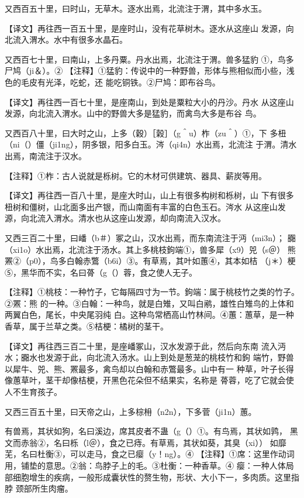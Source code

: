 \documentclass[a4paper,12pt,UTF8,twoside]{ctexbook}
\begin{document}
又西百五十里，曰时山，无草木。逐水出焉，北流注于渭，其中多水玉。

【译文】再往西一百五十里，是座时山，没有花草树木。逐水从这座山 发源，向北流入渭水。水中有很多水晶石。

又西百七十里，曰南山，上多丹粟。丹水出焉，北流注于渭。兽多猛豹 ①，鸟多尸鸠（ji＆）。② 【注释】①猛豹：传说中的一种野兽，形体与熊相似而小些，浅色的毛皮有光泽，吃蛇，还 能吃铜铁。②尸鸠：即布谷鸟。

【译文】再往西一百七十里，是座南山，到处是粟粒大小的丹沙。丹水 从这座山发源，向北流入渭水。山中的野兽大多是猛豹，而禽鸟大多是布谷 鸟。

又西百八十里，曰大时之山，上多（穀）［榖］（g＾u）柞（zu＾）①，下 多杻（ni（）僵（ji1ng），阴多银，阳多白玉。涔（qi4n）水出焉，北流注 于渭。清水出焉，南流注于汉水。

【注释】①柞：古人说就是栎树。它的木材可供建筑、器具、薪炭等用。

【译文】再往西一百八十里，是座大时山，山上有很多构树和栎树，山 下有很多杻树和僵树，山北面多出产银，而山南面有丰富的白色玉石。涔水 从这座山发源，向北流入渭水。清水也从这座山发源，却向南流入汉水。

又西三百二十里，曰嶓（b＃）冢之山，汉水出焉，而东南流注于沔（mi3n）； 嚻（xi1o）水出焉，北流注于汤水。其上多桃枝鉤端①，兽多犀（x9）兕（s＠） 熊罴②（p0），鸟多白翰赤鷩（b6i）③。有草焉，其叶如蕙④，其本如桔 （j＊）梗⑤，黑华而不实，名曰蓇（g（）蓉，食之使人无子。

【注释】①桃枝：一种竹子，它每隔四寸为一节。鉤端：属于桃枝竹之类的竹子。②罴：熊 的一种。③白翰：一种鸟，就是白雉，又叫白鹇，雄性白雉鸟的上体和两翼白色，尾长，中央尾羽纯 白。这种鸟常栖高山竹林间。④蕙：蕙草，是一种香草，属于兰草之类。⑤桔梗：橘树的茎干。

【译文】再往西三百二十里，是座嶓冢山，汉水发源于此，然后向东南 流入沔水；嚻水也发源于此，向北流入汤水。山上到处是葱茏的桃枝竹和鉤 端竹，野兽以犀牛、兕、熊、罴最多，禽鸟却以白翰和赤鷩最多。山中有一 种草，叶子长得像蕙草叶，茎干却像桔梗，开黑色花朵但不结果实，名称是 蓇蓉，吃了它就会使人不生育孩子。

又西三百五十里，曰天帝之山，上多棕枏（n2n），下多菅（ji1n）蕙。

有兽焉，其状如狗，名曰溪边，席其皮者不蛊（g（）①。有鸟焉，其状如鹑， 黑文而赤翁②，名曰栎（l＠），食之已痔。有草焉，其状如葵，其臭（xi）） 如靡芜，名曰杜衡③，可以走马，食之已瘿（y！ng）。④  【注释】①席：这里作动词用，铺垫的意思。②翁：鸟脖子上的毛。③杜衡：一种香草。④ 瘿：一种人体局部细胞增生的疾病，一般形成囊状性的赘生物，形状、大小下一，多肉质。这里指脖 颈部所生肉瘤。
\end{document}
